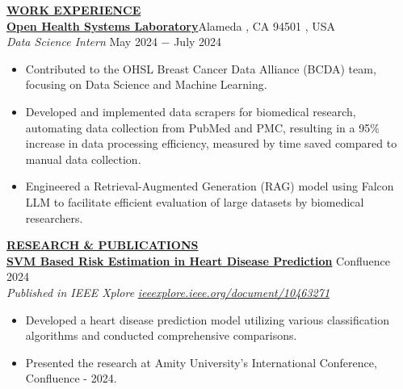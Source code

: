 \documentclass{article}
\begin{document}
% 
%
\noindent \textbf{\underline{WORK EXPERIENCE}} \\
\noindent \href{https://github.com/Yash-29-10-2003/ohslBCDA}{\textbf{Open Health Systems Laboratory}}\hfill Alameda , CA 94501 , USA \\
\textit{Data Science Intern} \hfill May 2024 $-$ July 2024
\begin{itemize}[noitemsep,nolistsep,leftmargin=*]
\item {Contributed to the OHSL Breast Cancer Data Alliance (BCDA) team, focusing on Data Science and Machine Learning.}
\item {Developed and implemented data scrapers for biomedical research, automating data collection from PubMed and PMC, resulting in a 95\% increase in data processing efficiency, measured by time saved compared to manual data collection.}
\item { Engineered a Retrieval-Augmented Generation (RAG) model using Falcon LLM to facilitate efficient evaluation of large datasets by biomedical researchers.\\}
\end{itemize}

\noindent \textbf{\underline{RESEARCH \& PUBLICATIONS}} \\
\noindent \href{https://ieeexplore.ieee.org/document/10463271}{\textbf{SVM Based Risk Estimation in Heart Disease Prediction}} 
\hfill Confluence 2024 \\
\textit{Published in IEEE Xplore} 
\hfill \href{https://ieeexplore.ieee.org/document/10463271}{\textit{ieeexplore.ieee.org/document/10463271}}
\begin{itemize}[noitemsep,nolistsep,leftmargin=*]
\item {Developed a heart disease prediction model utilizing various classification algorithms and conducted comprehensive comparisons.}
\item {Presented the research at Amity University's International Conference, Confluence - 2024.\\}
\end{itemize}
\end{document}
